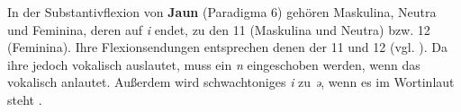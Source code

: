 
In der Substantivflexion von \textbf{Jaun} (Paradigma 6) gehören Maskulina, Neutra und Feminina, deren  auf \textit{i} endet, zu den  11 (Maskulina und Neutra) bzw. 12 (Feminina). Ihre Flexionsendungen entsprechen denen der  11 und 12 (vgl. ). Da ihre  jedoch vokalisch auslautet, muss ein \textit{n} eingeschoben werden, wenn das  vokalisch anlautet. Außerdem wird schwachtoniges \textit{i} zu \textit{ə}, wenn es im Wortinlaut steht \citep[159-164]{Stucki1917}.


\begin{table}
\caption{\textit{N} zur Hiatvermeidung in Jaun (basierend auf \citealt[255-272]{Stucki1917})}\label{table5.6}
\end{table}

